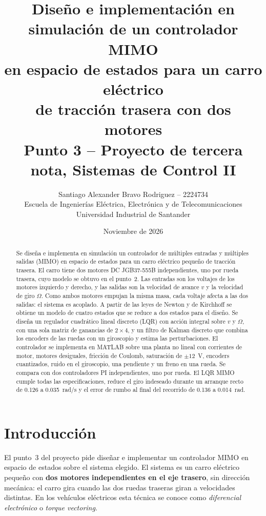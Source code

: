 \documentclass[11pt,letterpaper]{article}
\title{\textbf{Diseño e implementación en simulación de un controlador MIMO\\
en espacio de estados para un carro eléctrico\\ de tracción trasera con dos motores}\\[4pt]
\large Punto 3 -- Proyecto de tercera nota, Sistemas de Control II}
\author{Santiago Alexander Bravo Rodriguez -- 2224734\\
Escuela de Ingenierías Eléctrica, Electrónica y de Telecomunicaciones\\
Universidad Industrial de Santander}
\date{Noviembre de 2026}
\begin{document}
\maketitle

\begin{abstract}
Se diseña e implementa en simulación un controlador de múltiples entradas y múltiples salidas (MIMO) en espacio de estados para un carro eléctrico pequeño de tracción trasera. El carro tiene dos motores DC JGB37-555B independientes, uno por rueda trasera, cuyo modelo se obtuvo en el punto~2. Las entradas son los voltajes de los motores izquierdo y derecho, y las salidas son la velocidad de avance $v$ y la velocidad de giro $\Omega$. Como ambos motores empujan la misma masa, cada voltaje afecta a las dos salidas: el sistema es acoplado. A partir de las leyes de Newton y de Kirchhoff se obtiene un modelo de cuatro estados que se reduce a dos estados para el diseño. Se diseña un regulador cuadrático lineal discreto (LQR) con acción integral sobre $v$ y $\Omega$, con una sola matriz de ganancias de $2\times4$, y un filtro de Kalman discreto que combina los encoders de las ruedas con un giroscopio y estima las perturbaciones. El controlador se implementa en MATLAB sobre una planta no lineal con corrientes de motor, motores desiguales, fricción de Coulomb, saturación de $\pm12$~V, encoders cuantizados, ruido en el giroscopio, una pendiente y un freno en una rueda. Se compara con dos controladores PI independientes, uno por rueda. El LQR MIMO cumple todas las especificaciones, reduce el giro indeseado durante un arranque recto de 0.126 a 0.035~rad/s y el error de rumbo al final del recorrido de 0.136 a 0.014~rad.
\end{abstract}

\tableofcontents
\bigskip

\section{Introducción}
El punto~3 del proyecto pide diseñar e implementar un controlador MIMO en espacio de estados sobre el sistema elegido. El sistema es un carro eléctrico pequeño con \textbf{dos motores independientes en el eje trasero}, sin dirección mecánica: el carro gira cuando las dos ruedas traseras giran a velocidades distintas. En los vehículos eléctricos esta técnica se conoce como \emph{diferencial electrónico} o \emph{torque vectoring}.
\end{document}
